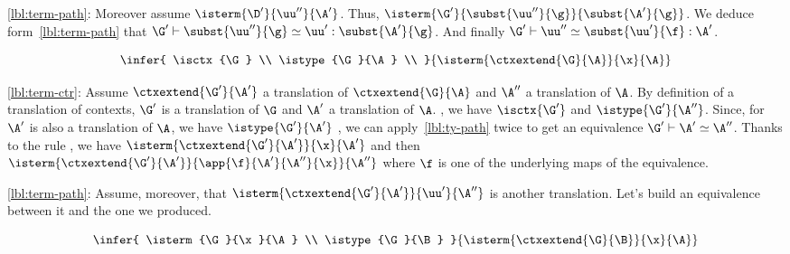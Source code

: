 \eqref{lbl:term-path}: Moreover assume $\isterm{\D'}{\uu''}{\A'}$.
Thus, $\isterm{\G'}{\subst{\uu''}{\g}}{\subst{\A'}{\g}}$.
We deduce form~\eqref{lbl:term-path} that
$\G' \vdash \subst{\uu''}{\g} \simeq \uu' : \subst{\A'}{\g}$.
And finally
$\G' \vdash \uu'' \simeq \subst{\uu'}{\f} : \A'$.




%
\begin{equation*}
  \infer{
    \isctx{\G} \\
    \istype{\G}{\A} \\
  }{
    \isterm
      {\ctxextend{\G}{\A}}
      {\x}
      {\A}
  }
\end{equation*}

\eqref{lbl:term-ctr}: Assume $\ctxextend{\G'}{\A'}$ a translation of
$\ctxextend{\G}{\A}$ and $\A''$ a translation of $\A$.
By definition of a translation of contexts, $\G'$ is a translation of
$\G$ and $\A'$ a translation of $\A$.
, we have $\isctx{\G'}$ and $\istype{\G'}{\A''}$.
Since, for $\A'$ is also a translation of $\A$, we have $\istype{\G'}{\A'}$
, we can apply~\eqref{lbl:ty-path} twice to get an equivalence
$\G' \vdash \A' \simeq \A''$.
Thanks to the rule , we have
$\isterm{\ctxextend{\G'}{\A'}}{\x}{\A'}$
and then
$\isterm{\ctxextend{\G'}{\A'}}{\app{\f}{\A'}{\A''}{\x}}{\A''}$
where $\f$ is one of the underlying maps of the equivalence.

\eqref{lbl:term-path}: Assume, moreover, that
$\isterm{\ctxextend{\G'}{\A'}}{\uu'}{\A''}$
is another translation. Let's build an equivalence between it and the one we
produced.



\begin{equation*}
  \infer{
    \isterm{\G}{\x}{\A} \\
    \istype{\G}{\B}
  }{
    \isterm
      {\ctxextend{\G}{\B}}
      {\x}
      {\A}
  }
\end{equation*}

